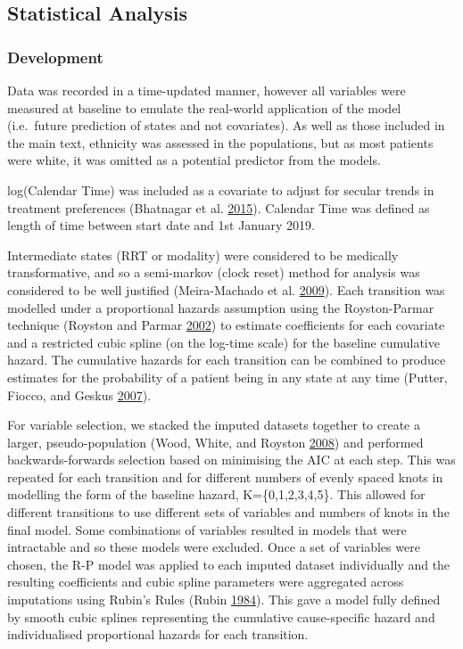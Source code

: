 \documentclass[
]{article}
\begin{document}
\hypertarget{statistical-analysis}{%
\subsection{Statistical Analysis}\label{statistical-analysis}}

\hypertarget{development-1}{%
\subsubsection{Development}\label{development-1}}

Data was recorded in a time-updated manner, however all variables were measured at baseline to emulate the real-world application of the model (i.e.~future prediction of states and not covariates). As well as those included in the main text, ethnicity was assessed in the populations, but as most patients were white, it was omitted as a potential predictor from the models.

log(Calendar Time) was included as a covariate to adjust for secular trends in treatment preferences (Bhatnagar et al. \protect\hyperlink{ref-bhatnagar_epidemiology_2015}{2015}). Calendar Time was defined as length of time between start date and 1st January 2019.

Intermediate states (RRT or modality) were considered to be medically transformative, and so a semi-markov (clock reset) method for analysis was considered to be well justified (Meira-Machado et al. \protect\hyperlink{ref-meira-machado_multi-state_2009}{2009}). Each transition was modelled under a proportional hazards assumption using the Royston-Parmar technique (Royston and Parmar \protect\hyperlink{ref-royston_flexible_2002}{2002}) to estimate coefficients for each covariate and a restricted cubic spline (on the log-time scale) for the baseline cumulative hazard. The cumulative hazards for each transition can be combined to produce estimates for the probability of a patient being in any state at any time (Putter, Fiocco, and Geskus \protect\hyperlink{ref-putter_tutorial_2007}{2007}).

For variable selection, we stacked the imputed datasets together to create a larger, pseudo-population (Wood, White, and Royston \protect\hyperlink{ref-wood_how_2008}{2008}) and performed backwards-forwards selection based on minimising the AIC at each step. This was repeated for each transition and for different numbers of evenly spaced knots in modelling the form of the baseline hazard, K=\{0,1,2,3,4,5\}. This allowed for different transitions to use different sets of variables and numbers of knots in the final model. Some combinations of variables resulted in models that were intractable and so these models were excluded. Once a set of variables were chosen, the R-P model was applied to each imputed dataset individually and the resulting coefficients and cubic spline parameters were aggregated across imputations using Rubin's Rules (Rubin \protect\hyperlink{ref-rubin_multiple_1984}{1984}). This gave a model fully defined by smooth cubic splines representing the cumulative cause-specific hazard and individualised proportional hazards for each transition.
\end{document}
